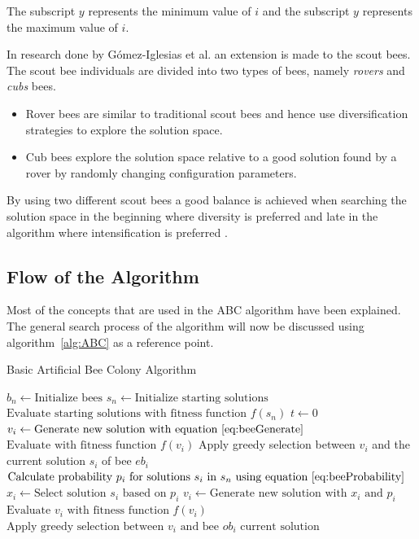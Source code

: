 The subscript $y$ represents the minimum value of $i$ and the subscript $y$ represents the maximum value of $i$.

In research done by G\'{o}mez-Iglesias et al. \cite{ABCFusionGrid} an extension is made to the scout bees. The scout bee individuals are divided into two types of bees, namely \emph{rovers} and \emph{cubs} bees\cite{ABCFusionGrid}.
\begin{itemize}
\item{Rover bees} are similar to traditional scout bees and hence use diversification strategies to explore the solution space. 
\item {Cub bees} explore the solution space relative to a good solution found by a rover by randomly changing configuration parameters. 
\end{itemize}
By using two different scout bees a good balance is achieved when searching the solution space in the beginning where diversity is preferred and late in the algorithm where intensification is preferred \cite{ABCFusionGrid}.
\subsection{Flow of the Algorithm}
Most of the concepts that are used in the ABC algorithm have been explained. The general search process of the algorithm will now be discussed using algorithm~\ref{alg:ABC} as a reference point.
\begin{algorithm}[H]
\caption{Basic Artificial Bee Colony Algorithm\cite{ABCCompareStudy}}
\label{alg:ABC}
	\begin{algorithmic}[1]
		\State$b_n \leftarrow \text{Initialize bees}$
		\State$s_n \leftarrow \text{Initialize starting solutions}$
		\State$\text{Evaluate starting solutions with fitness function $f(s_n)$}$
		\State$t \leftarrow 0$
				\State$v_i \leftarrow \text{Generate new solution with equation~\ref{eq:beeGenerate}}$
				\State$\text{Evaluate with fitness function $f(v_i)$}$
				\State Apply greedy selection between $v_i$ and the current solution $s_i$ of bee $eb_i$
			\EndFor
			\State$\text{Calculate probability $p_i$ for solutions $s_i$ in $s_n$ using equation~\ref{eq:beeProbability}}$
				\State$x_i \leftarrow \text{Select solution $s_i$ based on $p_i$} $
				\State$v_i \leftarrow \text{Generate new solution with $x_i$ and $p_i$}$
				\State$\text{Evaluate $v_i$ with fitness function $f(v_i)$}$
				\State$\text{Apply greedy selection between $v_i$ and bee $ob_i$ current solution}$
			\EndFor
	\end{algorithmic}
\end{algorithm}

